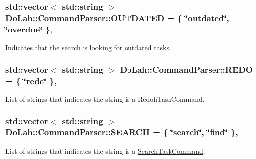 \subsubsection[{O\+U\+T\+D\+A\+T\+E\+D}]{\setlength{\rightskip}{0pt plus 5cm}std\+::vector$<$ std\+::string $>$ Do\+Lah\+::\+Command\+Parser\+::\+O\+U\+T\+D\+A\+T\+E\+D = \{ \char`\"{}outdated\char`\"{}, \char`\"{}overdue\char`\"{} \}\hspace{0.3cm}{\ttfamily [static]}, {\ttfamily [private]}}\label{class_do_lah_1_1_command_parser_aad7bb4ba109bb70f6997885b99e0ab66}


Indicates that the search is looking for outdated tasks. 

\hypertarget{class_do_lah_1_1_command_parser_a947bf7899fda03c33aced5b1458bc00e}{}
\subsubsection[{R\+E\+D\+O}]{\setlength{\rightskip}{0pt plus 5cm}std\+::vector$<$ std\+::string $>$ Do\+Lah\+::\+Command\+Parser\+::\+R\+E\+D\+O = \{ \char`\"{}redo\char`\"{} \}\hspace{0.3cm}{\ttfamily [static]}, {\ttfamily [private]}}\label{class_do_lah_1_1_command_parser_a947bf7899fda03c33aced5b1458bc00e}


List of strings that indicates the string is a Redoh\+Task\+Command. 

\hypertarget{class_do_lah_1_1_command_parser_a2681caa42d19e5e414a54288ee705317}{}
\subsubsection[{S\+E\+A\+R\+C\+H}]{\setlength{\rightskip}{0pt plus 5cm}std\+::vector$<$ std\+::string $>$ Do\+Lah\+::\+Command\+Parser\+::\+S\+E\+A\+R\+C\+H = \{ \char`\"{}search\char`\"{}, \char`\"{}find\char`\"{} \}\hspace{0.3cm}{\ttfamily [static]}, {\ttfamily [private]}}\label{class_do_lah_1_1_command_parser_a2681caa42d19e5e414a54288ee705317}


List of strings that indicates the string is a \hyperlink{class_do_lah_1_1_search_task_command}{Search\+Task\+Command}. 

